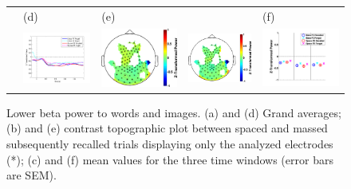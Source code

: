 \begin{figure}[H]
\begin{tabular}{ccccc}
  & \multicolumn{1}{l}{(d)} & \multicolumn{1}{l}{(e)} & & \multicolumn{1}{l}{(f)} \\
  \raisebox{1.8cm}{\rotatebox{90}{Image}} & \includegraphics[width=.30\textwidth]{./figs/exp1/tfr_line_ga_img_RgH_rc_mass_p2_img_RgH_fo_mass_p2_img_RgH_rc_spac_p2_img_RgH_fo_spac_p2_78ROIs_-100_1000_13_21_legend} &
  \includegraphics[width=.19\textwidth]{./figs/exp1/tfr_topocont_ga_img_RgH_rc_spac_p2vsimg_RgH_rc_mass_p2_78ROIs_13_21_0_500_-1p0_1p0_cb} &
  \includegraphics[width=.19\textwidth]{./figs/exp1/tfr_topocont_ga_img_RgH_rc_spac_p2vsimg_RgH_rc_mass_p2_78ROIs_13_21_520_1000_-1p0_1p0_cb} &
  \includegraphics[width=.30\textwidth]{./figs/exp1/tfr_avg_ga_img_RgH_rc_mass_p2_img_RgH_fo_mass_p2_img_RgH_rc_spac_p2_img_RgH_fo_spac_p2_78ROI_0_333_333_666_666_1000_13_21_ylabel} \\
  \end{tabular}
  \caption{Lower beta power to words and images.  (a) and (d) Grand averages; (b) and (e) contrast topographic plot between spaced and massed subsequently recalled trials displaying only the analyzed electrodes (*); (c) and (f) mean values for the three time windows (error bars are SEM).}
  \label{fig:word_img_beta_low}
\end{figure}

